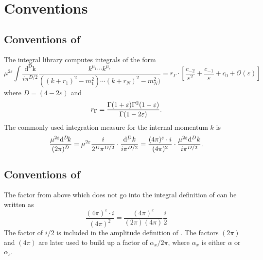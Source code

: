 \chapter{Conventions}
\label{sec:conventions}

\section{Conventions of \golemVC}
The integral library \golemVC{} computes integrals of the form
\begin{equation}
\mu^{2\varepsilon}\int\frac{\mathrm{d^D k}}{i\pi^{D/2}}\frac{k^{\mu_1}\cdots k^{\mu_r}}{((k+r_1)^2-m_1^2)\cdots(k+r_N)^2-m_N^2)}
=r_\Gamma\cdot\left[\frac{c_{-2}}{\varepsilon^2}+\frac{c_{-1}}{\varepsilon}+c_0
+{\mathcal{O}}(\varepsilon)\right]
\end{equation}
where $D=(4-2\varepsilon)$ and
\begin{equation}
r_\Gamma=\frac{\Gamma(1+\varepsilon)\Gamma^2(1-\varepsilon)}{%
   \Gamma(1-2\varepsilon)}.
\end{equation}
The commonly used integration measure for the internal momentum $k$ is
\begin{equation}
\frac{\mu^{2\varepsilon}\diff[D]k}{(2\pi)^D}
=\mu^{2\varepsilon}\frac{i}{2^D\pi^{D/2}}\cdot\frac{{\mathrm d}^Dk}{i\pi^{D/2}}
=\frac{(4\pi)^\varepsilon \cdot i}{(4\pi)^2}\cdot%
 \frac{\mu^{2\varepsilon}{\mathrm d}^Dk}{i\pi^{D/2}}.
\end{equation}

\section{Conventions of \gosamv}
The factor from above which does not go into the integral definition of
\golemVC{} can be written as
\begin{equation}
\frac{(4\pi)^\varepsilon \cdot i}{(4\pi)^2}=
\frac{(4\pi)^\varepsilon}{(2\pi)(4\pi)}\frac{i}{2}
\end{equation}
The factor of $i/2$ is included in the amplitude definition of \gosamv{}.
The factors $(2\pi)$ and $(4\pi)$ are later used to build up a factor of
$\alpha_x/2\pi$, where $\alpha_x$ is either $\alpha$ or $\alpha_s$.

